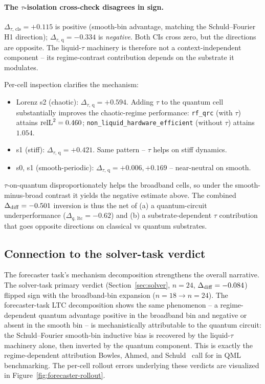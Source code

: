 \paragraph{The $\tau$-isolation cross-check disagrees in sign.}
$\Delta_{\tau,\,\text{cls}} = +0.115$ is positive (smooth-bin
advantage, matching the Schuld--Fourier H1 direction);
$\Delta_{\tau,\,\text{q}} = -0.334$ is \emph{negative}. Both CIs
cross zero, but the directions are opposite. The liquid-$\tau$
machinery is therefore not a context-independent component -- its
regime-contrast contribution depends on the substrate it
modulates.

Per-cell inspection clarifies the mechanism:
\begin{itemize}
  \item Lorenz s2 (chaotic): $\Delta_{\tau,\,\text{q}} =
        +0.594$. Adding $\tau$ to the quantum cell substantially
        improves the chaotic-regime performance:
        \texttt{rf\_qrc} (with $\tau$) attains $\mathrm{relL}^2 = 0.460$;
        \texttt{non\_liquid\_hardware\_efficient} (without $\tau$)
        attains $1.054$.
  \item \vdp{} s1 (stiff): $\Delta_{\tau,\,\text{q}} =
        +0.421$. Same pattern -- $\tau$ helps on stiff dynamics.
  \item \lv{} s0, s1 (smooth-periodic):
        $\Delta_{\tau,\,\text{q}} = +0.006, +0.169$ --
        near-neutral on smooth.
\end{itemize}

$\tau$-on-quantum disproportionately helps the broadband cells, so
under the smooth-minus-broad contrast it yields the negative
estimate above. The combined $\Delta_{\mathrm{diff}} = -0.501$ inversion is thus
the net of (a) a quantum-circuit underperformance
($\Delta_{q,\,\text{ltc}} = -0.62$) and (b) a substrate-dependent
$\tau$ contribution that goes opposite directions on classical
vs quantum substrates.

\subsection{Connection to the solver-task verdict}
\label{sec:forecaster-vs-solver}

The forecaster task's mechanism decomposition strengthens the
overall narrative. The solver-task primary verdict
(Section~\ref{sec:solver}, $n=24$, $\Delta_{\mathrm{diff}} = -0.084$) flipped sign
with the broadband-bin expansion ($n=18 \to n=24$). The
forecaster-task LTC decomposition shows the same phenomenon -- a
regime-dependent quantum advantage positive in the broadband bin
and negative or absent in the smooth bin -- is mechanistically
attributable to the quantum circuit: the Schuld--Fourier smooth-bin
inductive bias is recovered by the liquid-$\tau$ machinery alone,
then inverted by the quantum component. This is exactly the
regime-dependent attribution Bowles, Ahmed, and
Schuld~\cite{bowles2024better} call for in QML benchmarking. The
per-cell rollout errors underlying these verdicts are visualized
in Figure~\ref{fig:forecaster-rollout}.

